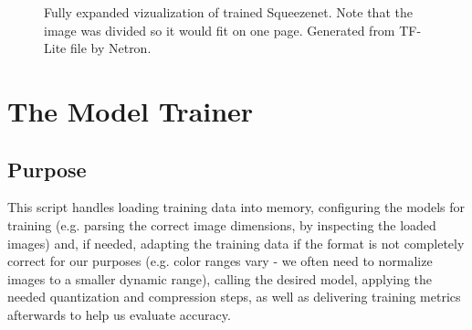 \begin{figure}[!tbp]
\caption{Fully expanded vizualization of trained Squeezenet. Note that the image was divided so it would fit on one page. Generated from TF-Lite file by Netron. \cite{netron}}
\label{netron_sqnet}
\end{figure}

\section{The Model Trainer}
\subsection{Purpose}
This script handles loading training data into memory, configuring the models for training (e.g. parsing the correct image dimensions, by inspecting the loaded images) and, if needed, adapting the training data if the format is not completely correct for our purposes (e.g. color ranges vary - we often need to normalize images to a smaller dynamic range), calling the desired model, applying the needed quantization and compression steps, as well as delivering training metrics afterwards to help us evaluate accuracy. 
